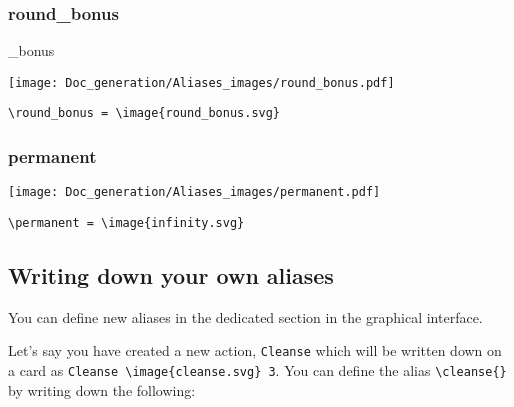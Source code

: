 \documentclass{article}
\begin{document}
\subsubsection{round\_bonus}
\begin{minipage}{0.45\linewidth}
\raggedright
\begin{spverbatim}
\round_bonus 
\end{spverbatim}
\end{minipage}
\begin{minipage}{0.45\linewidth}
\raggedleft
\texttt{[image: Doc\_generation/Aliases\_images/round\_bonus.pdf]}
\end{minipage}
\begin{center}
\begin{BVerbatim}
\round_bonus = \image{round_bonus.svg}
\end{BVerbatim}
\end{center}

\subsubsection{permanent}
\begin{minipage}{0.45\linewidth}
\raggedright
\begin{spverbatim}
\permanent 
\end{spverbatim}
\end{minipage}
\begin{minipage}{0.45\linewidth}
\raggedleft
\texttt{[image: Doc\_generation/Aliases\_images/permanent.pdf]}
\end{minipage}
\begin{center}
\begin{BVerbatim}
\permanent = \image{infinity.svg}
\end{BVerbatim}
\end{center}




\subsection{Writing down your own aliases}
You can define new aliases in the dedicated section in the graphical interface.

Let's say you have created a new action, \verb`Cleanse` which will be written down on a card as \verb`Cleanse \image{cleanse.svg} 3`. You can define the alias \verb`\cleanse{}` by writing down the following:
\end{document}
